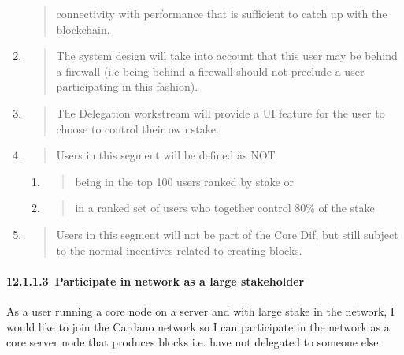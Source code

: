 \documentclass[]{article}
\let\oldparagraph\paragraph
\renewcommand{\paragraph}[1]{\oldparagraph{#1}\mbox{}}
\begin{document}
\begin{enumerate}
\begin{quote}
  connectivity with performance that is sufficient to catch up with the
  blockchain.
  \end{quote}
\item
  \begin{quote}
  The system design will take into account that this user may be behind
  a firewall (i.e being behind a firewall should not preclude a user
  participating in this fashion).
  \end{quote}
\item
  \begin{quote}
  The Delegation workstream will provide a UI feature for the user to
  choose to control their own stake.
  \end{quote}
\item
  \begin{quote}
  Users in this segment will be defined as NOT
  \end{quote}

  \begin{enumerate}
  \def\labelenumii{\alph{enumii}.}
  \item
    \begin{quote}
    being in the top 100 users ranked by stake or
    \end{quote}
  \item
    \begin{quote}
    in a ranked set of users who together control 80\% of the stake
    \end{quote}
  \end{enumerate}
\item
  \begin{quote}
  Users in this segment will not be part of the Core Dif, but still
  subject to the normal incentives related to creating blocks.
  \end{quote}
\end{enumerate}

\hypertarget{participate-in-network-as-a-large-stakeholder}{%
\paragraph{​12.1.1.3​~Participate in network as a large stakeholder
}\label{participate-in-network-as-a-large-stakeholder}}

As a user running a core node on a server and with large stake in the
network, I would like to join the Cardano network so I can participate
in the network as a core server node that produces blocks i.e. have not
delegated to someone else.
\end{document}
